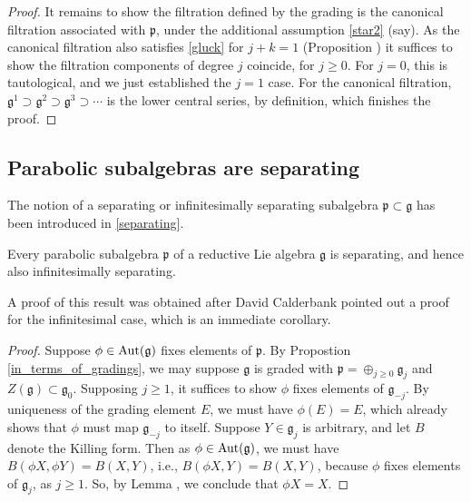 \documentclass[leqno,12pt]{amsart} %
\begin{document}
\begin{proof}
  It remains to show the filtration defined by the grading is the canonical filtration
  associated with ${\mathfrak p} $, under the additional assumption \eqref{star2}
  (say). As the canonical filtration also satisfies \eqref{gluck} for $j + k = 1$
  (Proposition ) it suffices to show the filtration components of
  degree $j$ coincide, for $j\ge 0$. For $j=0$, this is tautological, and we just
  established the $j=1$ case. For the canonical filtration,
  ${\mathfrak g}^1 \supset {\mathfrak g}^2 \supset {\mathfrak g}^3 \supset \cdots $ is the
  lower central series, by definition, which finishes the proof.
\end{proof}

\subsection{Parabolic subalgebras are separating}\label{separating_}
The notion of a {\df separating} or {\df infinitesimally separating} subalgebra
${\mathfrak p} \subset {\mathfrak g} $ has been introduced in \ref{separating}.
\begin{proposition}
  Every parabolic subalgebra ${\mathfrak p} $ of a reductive Lie algebra $\mathfrak g$ is
  separating, and hence also infinitesimally separating.
\end{proposition}
A proof of this result was obtained after David Calderbank pointed out a proof for the
infinitesimal case, which is an immediate corollary.
\begin{proof}
  Suppose $\phi \in \operatorname{Aut}({\mathfrak g})$ fixes elements of ${\mathfrak p}$. By
  Propostion \ref{in_terms_of_gradings}, we may suppose ${\mathfrak g} $ is graded with
  ${\mathfrak p} =\oplus_{j\ge0}{\mathfrak g}_j$ and
  $Z({\mathfrak g}) \subset {\mathfrak g}_0$.  Supposing $j \ge 1$, it suffices to show
  $\phi$ fixes elements of ${\mathfrak g}_{-j}$. By uniqueness of the grading element $E$,
  we must have $\phi(E) = E$, which already shows that $\phi $ must map
  ${\mathfrak g}_{-j}$ to itself. Suppose $Y \in {\mathfrak g}_j$ is arbitrary, and let
  $B$ denote the Killing form. Then as $\phi \in \operatorname{Aut}({\mathfrak g})$, we must
  have $B(\phi X, \phi Y) = B(X, Y)$, i.e., $B(\phi X, Y) = B(X, Y)$, because $\phi $
  fixes elements of ${\mathfrak g}_j$, as $j\ge 1$. So, by Lemma , we
  conclude that $\phi X = X$.
\end{proof}
\end{document}
